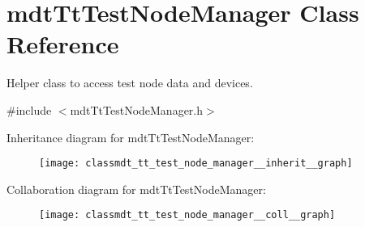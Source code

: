 \hypertarget{classmdt_tt_test_node_manager}{\section{mdt\-Tt\-Test\-Node\-Manager Class Reference}
\label{classmdt_tt_test_node_manager}
}


Helper class to access test node data and devices.  




{\ttfamily \#include $<$mdt\-Tt\-Test\-Node\-Manager.\-h$>$}



Inheritance diagram for mdt\-Tt\-Test\-Node\-Manager\-:\nopagebreak
\begin{figure}[H]
\begin{center}
\leavevmode
\texttt{[image: classmdt\_tt\_test\_node\_manager\_\_inherit\_\_graph]}
\end{center}
\end{figure}


Collaboration diagram for mdt\-Tt\-Test\-Node\-Manager\-:\nopagebreak
\begin{figure}[H]
\begin{center}
\leavevmode
\texttt{[image: classmdt\_tt\_test\_node\_manager\_\_coll\_\_graph]}
\end{center}
\end{figure}
